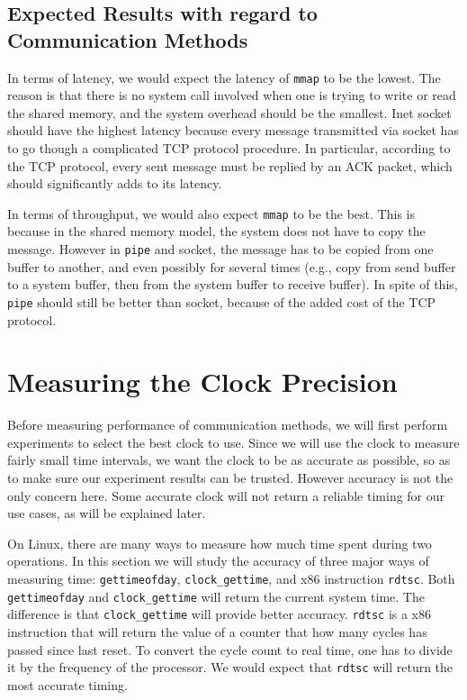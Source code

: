 \documentclass[11pt,conference]{IEEEtran}
\begin{document}
\subsection{Expected Results with regard to Communication Methods}
In terms of latency, we would expect the latency of \texttt{mmap} to be the lowest.
The reason is that there is no system call involved when one is trying to write or read the shared memory, and the system overhead should be the smallest.
Inet socket should have the highest latency because every message transmitted via socket has to go though a complicated TCP protocol procedure.
In particular, according to the TCP protocol, every sent message must be replied by an ACK packet, which should significantly adds to its latency.

In terms of throughput, we would also expect \texttt{mmap} to be the best.
This is because in the shared memory model, the system does not have to copy the message.
However in \texttt{pipe} and socket, the message has to be copied from one buffer to another, and even possibly for several times (e.g., copy from send buffer to a system buffer, then from the system buffer to receive buffer).
In spite of this, \texttt{pipe} should still be better than socket, because of the added cost of the TCP protocol.

\section{Measuring the Clock Precision}
\label{sec:clocks}
Before measuring performance of communication methods, we will first perform experiments to select the best clock to use.
Since we will use the clock to measure fairly small time intervals, we want the clock to be as accurate as possible, so as to make sure our experiment results can be trusted.
However accuracy is not the only concern here.
Some accurate clock will not return a reliable timing for our use cases, as will be explained later.

On Linux, there are many ways to measure how much time spent during two operations.
In this section we will study the accuracy of three major ways of measuring time: \texttt{gettimeofday}, \texttt{clock\_gettime}, and x86 instruction \texttt{rdtsc}.
Both \texttt{gettimeofday} and \texttt{clock\_gettime} will return the current system time.
The difference is that \texttt{clock\_gettime} will provide better accuracy.
\texttt{rdtsc} is a x86 instruction that will return the value of a counter that how many cycles has passed since last reset.
To convert the cycle count to real time, one has to divide it by the frequency of the processor.
We would expect that \texttt{rdtsc} will return the most accurate timing.
\end{document}

